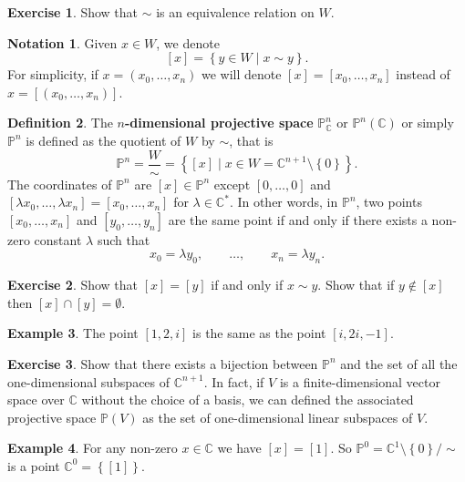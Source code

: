 \documentclass{article}
\newcommand{\C}{\mathbb{C}}
\renewcommand{\P}{\mathbb{P}}
\newcommand{\rb}[1]{\left( #1 \right)}
\renewcommand{\sb}[1]{\left[ #1 \right]}
\newcommand{\cb}[1]{\left\{ #1 \right\}}
\theoremstyle{definition}\newtheorem{definition}{Definition}[section]
\theoremstyle{definition}\newtheorem{notation}[definition]{Notation}
\theoremstyle{definition}\newtheorem{remark}[definition]{Remark}
\theoremstyle{definition}\newtheorem{example}[definition]{Example}
\theoremstyle{definition}\newtheorem{fact}{Fact}
\theoremstyle{definition}\newtheorem{exercise}{Exercise}
\begin{document}
\begin{exercise}
Show that $ \sim $ is an equivalence relation on $ W $.
\end{exercise}

\begin{notation}
Given $ x \in W $, we denote
$$ \sb{x} = \cb{y \in W \mid x \sim y}. $$
For simplicity, if $ x = \rb{x_0, \dots, x_n} $ we will denote $ \sb{x} = \sb{x_0, \dots, x_n} $ instead of $ x = \sb{\rb{x_0, \dots, x_n}} $.
\end{notation}

\begin{definition}
The \textbf{$ n $-dimensional projective space} $ \P^n_\C $ or $ \P^n\rb{\C} $ or simply $ \P^n $ is defined as the quotient of $ W $ by $ \sim $, that is
$$ \P^n = \dfrac{W}{\sim} = \cb{\sb{x} \mid x \in W = \C^{n + 1} \setminus \cb{0}}. $$
The coordinates of $ \P^n $ are $ \sb{x} \in \P^n $ except $ \sb{0, \dots, 0} $ and $ \sb{\lambda x_0, \dots, \lambda x_n} = \sb{x_0, \dots, x_n} $ for $ \lambda \in \C^* $. In other words, in $ \P^n $, two points $ \sb{x_0, \dots, x_n} $ and $ \sb{y_0, \dots, y_n} $ are the same point if and only if there exists a non-zero constant $ \lambda $ such that
$$ x_0 = \lambda y_0, \qquad \dots, \qquad x_n = \lambda y_n. $$
\end{definition}

\begin{exercise}
Show that $ \sb{x} = \sb{y} $ if and only if $ x \sim y $. Show that if $ y \notin \sb{x} $ then $ \sb{x} \cap \sb{y} = \emptyset $.
\end{exercise}

\begin{example}
The point $ \sb{1, 2, i} $ is the same as the point $ \sb{i, 2i, -1} $.
\end{example}

\begin{exercise}
Show that there exists a bijection between $ \P^n $ and the set of all the one-dimensional subspaces of $ \C^{n + 1} $. In fact, if $ V $ is a finite-dimensional vector space over $ \C $ without the choice of a basis, we can defined the associated projective space $ \P\rb{V} $ as the set of one-dimensional linear subspaces of $ V $.
\end{exercise}

\begin{example}
For any non-zero $ x \in \C $ we have $ \sb{x} = \sb{1} $. So $ \P^0 = \C^1 \setminus \cb{0} / \sim $ is a point $ \C^0 = \cb{\sb{1}} $.
\end{example}
\end{document}
